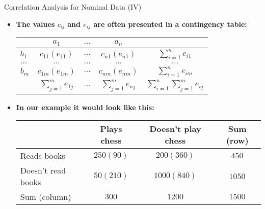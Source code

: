 \begin{frame}{Correlation Analysis for Nominal Data (IV)}
	\begin{itemize}
		\item \textbf{The values $c_{ij}$ and $e_{ij}$ are often presented in a
			      \color{airforceblue} contingency table:} \\
		      \begin{center}
			      \vspace{1mm}
			      \begin{tabular}{|l|c|c|c|c|}
				      \hline
				               & $a_1$                             & $\ldots$ & $a_n$             &
				      \\\hline
				      $b_1$    & $c_{11} (e_{11})$                 & $\ldots$ & $c_{n1} (e_{n1})$ &
				      $\sum_{i=1}^n e_{i1}$
				      \\\hline
				      $\ldots$ & $\ldots$                          & $\ldots$ & $\ldots$          & $\ldots$
				      \\\hline
				      $b_m$    & $c_{1m} (e_{1m})$                 & $\ldots$ & $c_{nm} (e_{nm})$ &
				      $\sum_{i=1}^n e_{im}$
				      \\\hline
				               & $\sum_{j=1}^m e_{1j}$             & $\ldots$ & $\sum_{j=1}^m
				      e_{nj}$  & $\sum_{i=1}^n\sum_{j=1}^m e_{ij}$
				      \\\hline
			      \end{tabular}
			      \vspace{2mm}
		      \end{center}
		\item \textbf{In our example it would look like this:} \\
		      \begin{center}
			      \vspace{1mm}
			      \begin{tabular}{|l|c|c|c|}
				      \hline
				                         & Plays chess & Doesn't play chess & Sum (row)
				      \\\hline
				      Reads books        & $250 (90)$  & $200 (360)$        & $450$
				      \\\hline
				      Doesn't read books & $50 (210)$  & $1000 (840)$       &
				      $1050$
				      \\\hline
				      Sum (column)       & $300$       & $1200$             & $1500$
				      \\\hline
			      \end{tabular}
		      \end{center}
	\end{itemize}
\end{frame}

